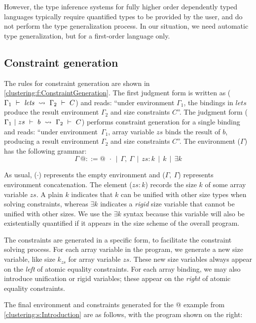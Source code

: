 However, the type inference systems for fully higher order dependently typed languages typically require quantified types to be provided by the user, and do not perform the type generalization process. In our situation, we need automatic type generalization, but for a first-order language only.



\subsection{Constraint generation}
The rules for constraint generation are shown in \cref{clustering:f:ConstraintGeneration}.
The first judgment form is written as ($\Gamma_1 ~\vdash~ \textit{lets} ~\leadsto~ \Gamma_2 ~\vdash~ C$) and reads: ``under environment $\Gamma_1$, the bindings in $\textit{lets}$ produce the result environment $\Gamma_2$ and size constraints $C$''.
The judgment form ($\Gamma_1 ~|~ zs ~\vdash~ b ~\leadsto~ \Gamma_2 ~\vdash~ C$) performs constraint generation for a single binding and reads: ``under environment~$\Gamma_1$, array variable $zs$ binds the result of $b$, producing a result environment $\Gamma_2$ and size constraints $C$''.
The environment ($\Gamma$) has the following grammar:
$$
\Gamma~ @::=@ ~~\cdot ~~|~~ \Gamma,~ \Gamma ~~|~~ zs : k ~~|~~ k ~~|~~ \exists k
$$

As usual, ($\cdot$) represents the empty environment and ($\Gamma,~ \Gamma$) represents environment concatenation.
The element ($zs : k$) records the size $k$ of some array variable $zs$.
A plain $k$ indicates that $k$ can be unified with other size types when solving constraints, whereas $\exists k$ indicates a  \emph{rigid} size variable that cannot be unified with other sizes.
We use the $\exists k$ syntax because this variable will also be existentially quantified if it appears in the size scheme of the overall program.

The constraints are generated in a specific form, to facilitate the constraint solving process.
For each array variable in the program, we generate a new size variable, like size $k_{zs}$ for array variable $zs$.
These new size variables always appear on the \emph{left} of atomic equality constraints.
For each array binding, we may also introduce unification or rigid variables; these appear on the \emph{right} of atomic equality constraints.

The final environment and constraints generated for the @ example from \cref{clustering:s:Introduction} are as follows, with the program shown on the right:

